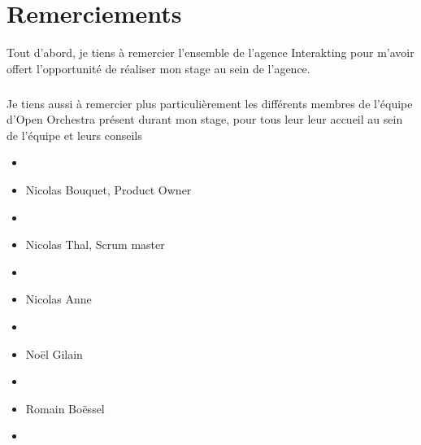 \chapter*{Remerciements}
Tout d'abord, je tiens à remercier l'ensemble de l'agence Interakting pour m'avoir offert l'opportunité de réaliser mon stage au sein de l'agence.
\paragraph{}
Je tiens aussi à remercier plus particulièrement les différents membres de l'équipe d'Open Orchestra présent durant mon stage, pour tous leur  leur accueil au sein de l'équipe et leurs conseils

\begin{itemize}
\item[]
\item Nicolas Bouquet, Product Owner
\item[]
\item Nicolas Thal, Scrum master
\item[]
\item Nicolas Anne 
\item[]
\item Noël Gilain
\item[]
\item Romain Boëssel
\item[]
\end{itemize}